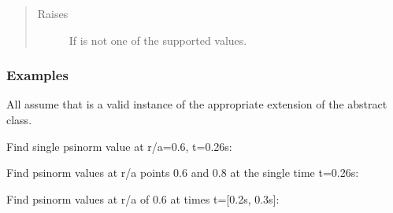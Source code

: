 \documentclass[letterpaper,10pt,english]{sphinxmanual}
\begin{document}
\begin{fulllineitems}
\begin{fulllineitems}
\begin{quote}
\begin{description}
\begin{itemize}
\end{itemize}


\item[{Raises}] \leavevmode
{} \textendash{} If  is not one of the supported values.

\end{description}\end{quote}
\subsubsection*{Examples}

All assume that  is a valid instance of the appropriate
extension of the {\hyperref[\detokenize{eqtools:eqtools.core.Equilibrium}]{}} abstract class.

Find single psinorm value at r/a=0.6, t=0.26s:

\begin{sphinxVerbatim}[commandchars=\\\{\}]
     
\end{sphinxVerbatim}

Find psinorm values at r/a points 0.6 and 0.8 at the
single time t=0.26s:

\begin{sphinxVerbatim}[commandchars=\\\{\}]
    \PYG{p}{[} \PYG{p}{]} 
\end{sphinxVerbatim}

Find psinorm values at r/a of 0.6 at times t={[}0.2s, 0.3s{]}:

\begin{sphinxVerbatim}[commandchars=\\\{\}]
     \PYG{p}{[} \PYG{p}{]}
\end{sphinxVerbatim}


\end{fulllineitems}
\end{fulllineitems}
\end{document}
